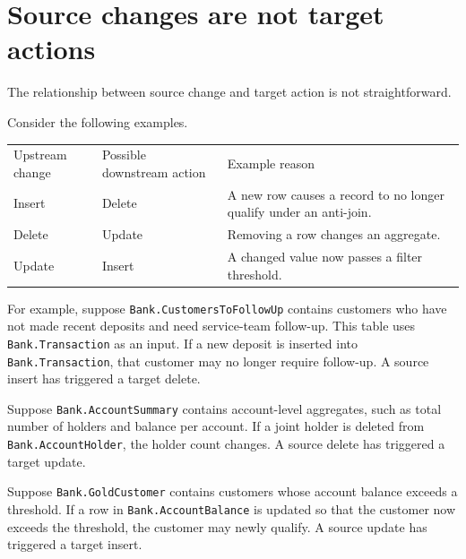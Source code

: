 \documentclass[10pt,openany,10pt]{book}
\newcounter{none}
\let\podeToprule\toprule
\let\podeMidrule\midrule
\let\podeBottomrule\bottomrule
\renewcommand{\toprule}{\arrayrulecolor{pbiGrid}\podeToprule}
\renewcommand{\midrule}{\arrayrulecolor{pbiGrid}\podeMidrule}
\renewcommand{\bottomrule}{\arrayrulecolor{pbiGrid}\podeBottomrule}
\begin{document}
\section{Source changes are not target
actions}\label{source-changes-are-not-target-actions}

The relationship between source change and target action is not
straightforward.

Consider the following examples.

{\def\LTcaptype{none} %
\begin{longtable}[]{@{}
  >{\raggedright\arraybackslash}p{}
  >{\raggedright\arraybackslash}p{}
  >{\raggedright\arraybackslash}p{}@{}}
\toprule\noalign{}
\begin{minipage}[b]{\linewidth}\raggedright
Upstream change
\end{minipage} & \begin{minipage}[b]{\linewidth}\raggedright
Possible downstream action
\end{minipage} & \begin{minipage}[b]{\linewidth}\raggedright
Example reason
\end{minipage} \\
\midrule\noalign{}
\endhead
\bottomrule\noalign{}
\endlastfoot
Insert & Delete & A new row causes a record to no longer qualify under
an anti-join. \\
Delete & Update & Removing a row changes an aggregate. \\
Update & Insert & A changed value now passes a filter threshold. \\
\end{longtable}
}

For example, suppose \texttt{Bank.CustomersToFollowUp} contains
customers who have not made recent deposits and need service-team
follow-up. This table uses \texttt{Bank.Transaction} as an input. If a
new deposit is inserted into \texttt{Bank.Transaction}, that customer
may no longer require follow-up. A source insert has triggered a target
delete.

Suppose \texttt{Bank.AccountSummary} contains account-level aggregates,
such as total number of holders and balance per account. If a joint
holder is deleted from \texttt{Bank.AccountHolder}, the holder count
changes. A source delete has triggered a target update.

Suppose \texttt{Bank.GoldCustomer} contains customers whose account
balance exceeds a threshold. If a row in \texttt{Bank.AccountBalance} is
updated so that the customer now exceeds the threshold, the customer may
newly qualify. A source update has triggered a target insert.
\end{document}
